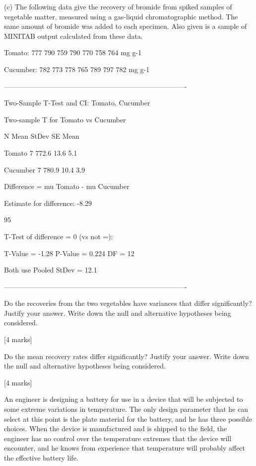(c) The following data give the recovery of bromide from spiked samples of vegetable matter, measured using a gas-liquid chromatographic method. The same amount of bromide was added to each specimen. Also given is a sample of MINITAB output calculated from these data.


Tomato: 777 790 759 790 770 758 764 mg g-1

Cucumber: 782 773 778 765 789 797 782 mg g-1



-------------------------------------------------------------------------------


Two-Sample T-Test and CI: Tomato, Cucumber

Two-sample T for Tomato vs Cucumber

N Mean StDev SE Mean

Tomato 7 772.6 13.6 5.1

Cucumber 7 780.9 10.4 3.9

Difference = mu Tomato - mu Cucumber

Estimate for difference: -8.29

95%

T-Test of difference = 0 (vs not =):

T-Value = -1.28 P-Value = 0.224 DF = 12

Both use Pooled StDev = 12.1

-------------------------------------------------------------------------------

Do the recoveries from the two vegetables have variances that differ significantly? Justify your answer. Write down the null and alternative hypotheses being considered.

[4 marks]

Do the mean recovery rates differ significantly? Justify your answer. Write down the null and alternative hypotheses being considered.

[4 marks]






An engineer is designing a battery for use in a device that will be subjected to some extreme variations in temperature. 
The only design parameter that he can select at this point is the plate material for the battery, and he has three possible choices. 
When the device is manufactured and is shipped to the field, the engineer has no control over the temperature extremes that the device will encounter, and he knows from experience 
that temperature will probably affect the effective battery life. 

